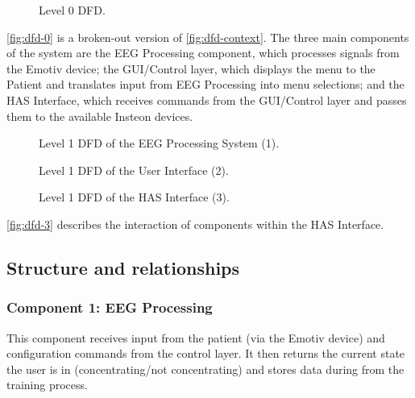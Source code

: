 \documentclass{article}
\begin{document}
\begin{figure}[h!]
    \centering
    \resizebox{\textwidth}{!}{
        
    }
    \caption{Level 0 DFD.}
    \label{fig:dfd-0}
\end{figure}

\autoref{fig:dfd-0} is a broken-out version of \autoref{fig:dfd-context}. The
three main components of the system are the EEG Processing component, which
processes signals from the Emotiv device; the GUI/Control layer, which
displays the menu to the Patient and translates input from EEG Processing into
menu selections; and the HAS Interface, which receives commands from the
GUI/Control layer and passes them to the available Insteon devices.

\begin{figure}[h!]
    \centering
    \resizebox{\textwidth}{!}{
        
    }
    \caption{Level 1 DFD of the EEG Processing System (1).}
    \label{fig:dfd-1}
\end{figure}

\begin{figure}[h!]
    \centering
    \resizebox{\textwidth}{!}{
        
    }
    \caption{Level 1 DFD of the User Interface (2).}
    \label{fig:dfd-2}
\end{figure}

\begin{figure}[h!]
    \centering
    \resizebox{\textwidth}{!}{
        
    }
    \caption{Level 1 DFD of the HAS Interface (3).}
    \label{fig:dfd-3}
\end{figure}

\autoref{fig:dfd-3} describes the interaction of components within the HAS
Interface.

\subsection{Structure and relationships}

\subsubsection{Component 1: EEG Processing}
This component receives input from the patient (via the Emotiv device) and
configuration commands from the control layer. It then returns the current
state the user is in (concentrating/not concentrating) and stores data
during from the training process.
\end{document}
